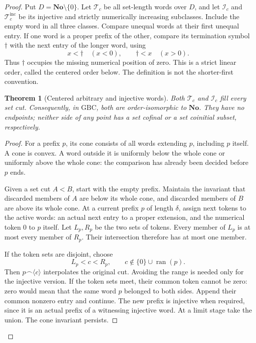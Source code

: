 \documentclass[11pt]{article}
\newtheorem{theorem}{Theorem}[section]
\theoremstyle{definition}
\theoremstyle{remark}
\newcommand{\No}{\mathbf{No}}
\newcommand{\Words}{\mathcal I}
\newcommand{\WordsAll}{\mathcal T}
\newcommand{\WordsInc}{\mathcal T^{\mathrm{inc}}}
\begin{document}
\begin{proof}
Put \(D=\No\setminus\{0\}\).  Let \(\WordsAll_c\) be all set-length
words over \(D\), and let \(\Words_c\) and
\(\WordsInc_c\) be its injective and strictly numerically
increasing subclasses.  Include the empty word in all three classes.
Compare unequal words at their first unequal entry.  If one word is a
proper prefix of the other, compare its termination symbol \(\dagger\)
with the next entry of the longer word, using
\[
             x<\dagger\quad(x<0),\qquad
             \dagger<x\quad(x>0).
\]
Thus \(\dagger\) occupies the missing numerical position of zero.
This is a strict linear order, called the centered order below.
The definition is not the shorter-first convention.

\begin{theorem}[Centered arbitrary and injective words]
\label{swo:sh:wv:centered-eta}
Both \(\WordsAll_c\) and \(\Words_c\) fill every
set cut.  Consequently, in \(\mathrm{GBC}\), both are
order-isomorphic to \(\No\).  They have no endpoints; neither side
of any point has a set cofinal or a set coinitial subset, respectively.
\end{theorem}

\begin{proof}
For a prefix \(p\), its cone consists of all words extending \(p\),
including \(p\) itself.  A cone is convex.  A word outside it is
uniformly below the whole cone or uniformly above the whole cone:
the comparison has already been decided before \(p\) ends.

Given a set cut \(A<B\), start with the empty prefix.  Maintain the
invariant that discarded members of \(A\) are below its whole cone,
and discarded members of \(B\) are above its whole cone.  At a current
prefix \(p\) of length \(\delta\), assign next tokens to the active
words: an actual next entry to a proper extension, and the numerical
token \(0\) to \(p\) itself.  Let \(L_p,R_p\) be the two sets of
tokens.  Every member of \(L_p\) is at most every member of \(R_p\).
Their intersection therefore has at most one member.

If the token sets are disjoint, choose
\[
          L_p<c<R_p,\qquad
          c\notin\{0\}\cup\operatorname{ran}(p).
\]
Then \(p\mathbin{\frown}\langle c\rangle\) interpolates the original
cut.  Avoiding the range is needed only for the injective version.
If the token sets meet, their common token cannot be zero: zero would
mean that the same word \(p\) belonged to both sides.  Append their
common nonzero entry and continue.  The new prefix is injective when
required, since it is an actual prefix of a witnessing injective word.
At a limit stage take the union.  The cone invariant persists.


\end{proof}
\end{proof}
\end{document}
